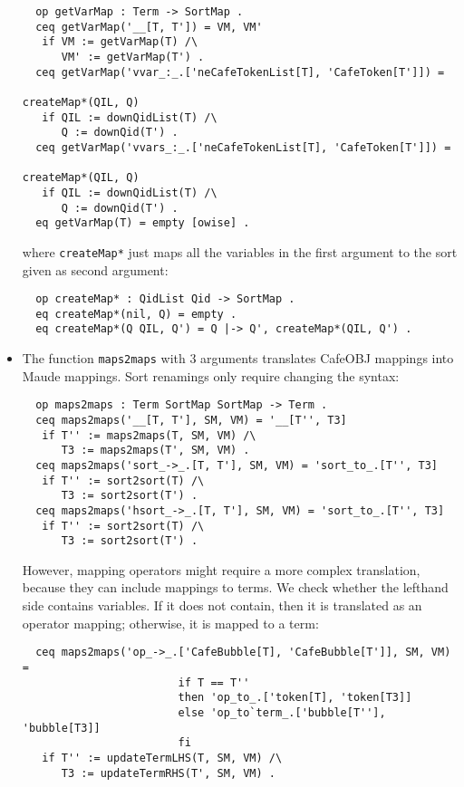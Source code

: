 \begin{itemize}
{\codesize
\begin{verbatim}
  op getVarMap : Term -> SortMap .
  ceq getVarMap('__[T, T']) = VM, VM'
   if VM := getVarMap(T) /\
      VM' := getVarMap(T') .
  ceq getVarMap('vvar_:_.['neCafeTokenList[T], 'CafeToken[T']]) =
                                                          createMap*(QIL, Q)
   if QIL := downQidList(T) /\
      Q := downQid(T') .
  ceq getVarMap('vvars_:_.['neCafeTokenList[T], 'CafeToken[T']]) =
                                                          createMap*(QIL, Q)
   if QIL := downQidList(T) /\
      Q := downQid(T') .
  eq getVarMap(T) = empty [owise] .
\end{verbatim}
}

\noindent
where \verb"createMap*" just maps all the variables in the first argument to the sort
given as second argument:

{\codesize
\begin{verbatim}
  op createMap* : QidList Qid -> SortMap .
  eq createMap*(nil, Q) = empty .
  eq createMap*(Q QIL, Q') = Q |-> Q', createMap*(QIL, Q') .
\end{verbatim}
}

\item
The function \verb"maps2maps" with $3$ arguments translates CafeOBJ mappings
into Maude mappings. Sort renamings only require changing the syntax:

{\codesize
\begin{verbatim}
  op maps2maps : Term SortMap SortMap -> Term .
  ceq maps2maps('__[T, T'], SM, VM) = '__[T'', T3]
   if T'' := maps2maps(T, SM, VM) /\
      T3 := maps2maps(T', SM, VM) .
  ceq maps2maps('sort_->_.[T, T'], SM, VM) = 'sort_to_.[T'', T3]
   if T'' := sort2sort(T) /\
      T3 := sort2sort(T') .
  ceq maps2maps('hsort_->_.[T, T'], SM, VM) = 'sort_to_.[T'', T3]
   if T'' := sort2sort(T) /\
      T3 := sort2sort(T') .
\end{verbatim}
}

However, mapping operators might require a more complex translation, because
they can include mappings to terms. We check whether the lefthand side contains
variables. If it does not contain, then it is translated as an operator mapping;
otherwise, it is mapped to a term:

{\codesize
\begin{verbatim}
  ceq maps2maps('op_->_.['CafeBubble[T], 'CafeBubble[T']], SM, VM) =
                        if T == T''
                        then 'op_to_.['token[T], 'token[T3]]
                        else 'op_to`term_.['bubble[T''], 'bubble[T3]]
                        fi
   if T'' := updateTermLHS(T, SM, VM) /\
      T3 := updateTermRHS(T', SM, VM) .
\end{verbatim}
}


\end{itemize}
